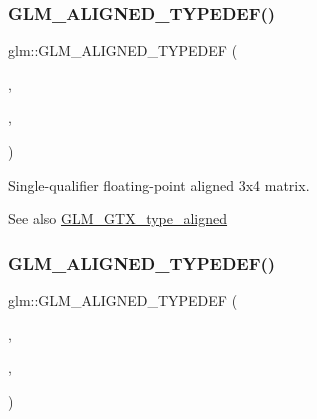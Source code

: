 \subsubsection{\texorpdfstring{G\+L\+M\+\_\+\+A\+L\+I\+G\+N\+E\+D\+\_\+\+T\+Y\+P\+E\+D\+E\+F()}{GLM\_ALIGNED\_TYPEDEF()}\hspace{0.1cm}{\footnotesize\ttfamily [189/209]}}
{\footnotesize\ttfamily glm\+::\+G\+L\+M\+\_\+\+A\+L\+I\+G\+N\+E\+D\+\_\+\+T\+Y\+P\+E\+D\+EF (\begin{DoxyParamCaption}\item[{\mbox{\hyperlink{group__gtc__type__precision_ga8459d79e94eb107e31f0ee600e9bae3f}{f32mat3x4}}}]{,  }\item[{aligned\+\_\+f32mat3x4}]{,  }\item[{16}]{ }\end{DoxyParamCaption})}

Single-\/qualifier floating-\/point aligned 3x4 matrix. \begin{DoxySeeAlso}{See also}
\mbox{\hyperlink{group__gtx__type__aligned}{G\+L\+M\+\_\+\+G\+T\+X\+\_\+type\+\_\+aligned}} 
\end{DoxySeeAlso}
\mbox{\label{group__gtx__type__aligned_ga99ce8274c750fbfdf0e70c95946a2875}} 
\subsubsection{\texorpdfstring{G\+L\+M\+\_\+\+A\+L\+I\+G\+N\+E\+D\+\_\+\+T\+Y\+P\+E\+D\+E\+F()}{GLM\_ALIGNED\_TYPEDEF()}\hspace{0.1cm}{\footnotesize\ttfamily [190/209]}}
{\footnotesize\ttfamily glm\+::\+G\+L\+M\+\_\+\+A\+L\+I\+G\+N\+E\+D\+\_\+\+T\+Y\+P\+E\+D\+EF (\begin{DoxyParamCaption}\item[{\mbox{\hyperlink{group__gtc__type__precision_gab0498cc84bb77002f41630e3cd0be87b}{f32mat4x2}}}]{,  }\item[{aligned\+\_\+f32mat4x2}]{,  }\item[{16}]{ }\end{DoxyParamCaption})}

